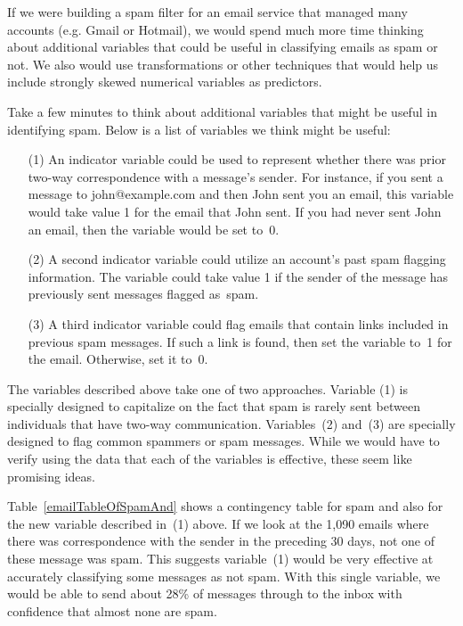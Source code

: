 If we were building a spam filter for an email service that managed many accounts (e.g. Gmail or Hotmail), we would spend much more time thinking about additional variables that could be useful in classifying emails as spam or not. We also would use transformations or other techniques that would help us include strongly skewed numerical variables as predictors.

Take a few minutes to think about additional variables that might be useful in identifying spam. Below is a list of variables we think might be useful:
\begin{enumerate}
\item[(1)] An indicator variable could be used to represent whether there was prior two-way correspondence with a message's sender. For instance, if you sent a message to john@example.com and then John sent you an email, this variable would take value 1 for the email that John sent. If you had never sent John an email, then the variable would be set to~0.
\item[(2)] A second indicator variable could utilize an account's past spam flagging information. The variable could take value 1 if the sender of the message has previously sent messages flagged as~spam.
\item[(3)] A third indicator variable could flag emails that contain links included in previous spam messages. If such a link is found, then set the variable to~1 for the email. Otherwise, set it to~0.
\end{enumerate}
The variables described above take one of two approaches. Variable (1) is specially designed to capitalize on the fact that spam is rarely sent between individuals that have two-way communication. Variables~(2) and~(3) are specially designed to flag common spammers or spam messages. While we would have to verify using the data that each of the variables is effective, these seem like promising ideas.

Table~\ref{emailTableOfSpamAnd} shows a contingency table for spam and also for the new variable described in~(1) above. If we look at the 1,090 emails where there was correspondence with the sender in the preceding 30 days, not one of these message was spam. This suggests variable~(1) would be very effective at accurately classifying some messages as not spam. With this single variable, we would be able to send about 28\% of messages through to the inbox with confidence that almost none are spam.


